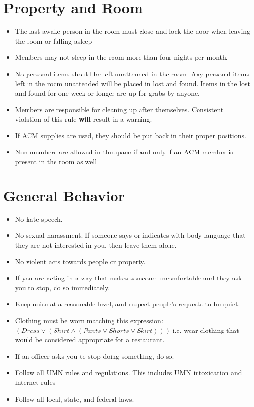 





\section{Property and Room}
\begin{itemize}
	\item The last awake person in the room must close and lock the door when leaving the room or falling asleep
	\item Members may not sleep in the room more than four nights per month.
	\item No personal items should be left unattended in the room. Any personal items left in the room unattended will be placed in lost and found. Items in the lost and found for one week or longer are up for grabs by anyone.
	\item Members are responsible for cleaning up after themselves. Consistent violation of this rule \textbf{will} result in a warning.
	\item If ACM supplies are used, they should be put back in their proper positions.
	\item Non-members are allowed in the space if and only if an ACM member is present in the room as well
\end{itemize}

\section{General Behavior}
\begin{itemize}
	\item No hate speech.
	\item No sexual harassment. If someone says or indicates with body language that they are not interested in you, then leave them alone.
	\item No violent acts towards people or property.
	\item If you are acting in a way that makes someone uncomfortable and they ask you to stop, do so immediately.
	\item Keep noise at a reasonable level, and respect people’s requests to be quiet.
	\item Clothing must be worn matching this expression: $(Dress \lor (Shirt \land (Pants \lor Shorts \lor Skirt)))$ i.e. wear clothing that would be considered appropriate for a restaurant.
	\item If an officer asks you to stop doing something, do so.
	\item Follow all UMN rules and regulations. This includes UMN intoxication and internet rules.
	\item Follow all local, state, and federal laws.
\end{itemize}


